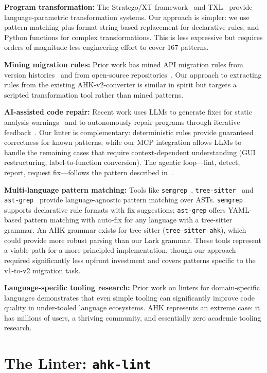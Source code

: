 \documentclass[11pt,a4paper]{article}
\begin{document}
\begin{enumerate}
\textbf{Program transformation:} The Stratego/XT framework~\cite{stratego} and TXL~\cite{txl} provide language-parametric transformation systems. Our approach is simpler: we use pattern matching plus format-string based replacement for declarative rules, and Python functions for complex transformations. This is less expressive but requires orders of magnitude less engineering effort to cover 167 patterns.

\textbf{Mining migration rules:} Prior work has mined API migration rules from version histories~\cite{api_migration} and from open-source repositories~\cite{libsync}. Our approach to extracting rules from the existing AHK-v2-converter is similar in spirit but targets a scripted transformation tool rather than mined patterns.

\textbf{AI-assisted code repair:} Recent work uses LLMs to generate fixes for static analysis warnings~\cite{fan2024survey} and to autonomously repair programs through iterative feedback~\cite{bouzenia2024repair}. Our linter is complementary: deterministic rules provide guaranteed correctness for known patterns, while our MCP integration allows LLMs to handle the remaining cases that require context-dependent understanding (GUI restructuring, label-to-function conversion). The agentic loop---lint, detect, report, request fix---follows the pattern described in~\cite{mcp}.

\textbf{Multi-language pattern matching:} Tools like \texttt{semgrep}~\cite{semgrep}, \texttt{tree-sitter}~\cite{treesitter} and \texttt{ast-grep}~\cite{astgrep} provide language-agnostic pattern matching over ASTs. \texttt{semgrep} supports declarative rule formats with fix suggestions; \texttt{ast-grep} offers YAML-based pattern matching with auto-fix for any language with a tree-sitter grammar. An AHK grammar exists for tree-sitter (\texttt{tree-sitter-ahk}), which could provide more robust parsing than our Lark grammar. These tools represent a viable path for a more principled implementation, though our approach required significantly less upfront investment and covers patterns specific to the v1-to-v2 migration task.

\textbf{Language-specific tooling research:} Prior work on linters for domain-specific languages demonstrates that even simple tooling can significantly improve code quality in under-tooled language ecosystems. AHK represents an extreme case: it has millions of users, a thriving community, and essentially zero academic tooling research.

\section{The Linter: \texttt{ahk-lint}}


\end{enumerate}
\end{document}
